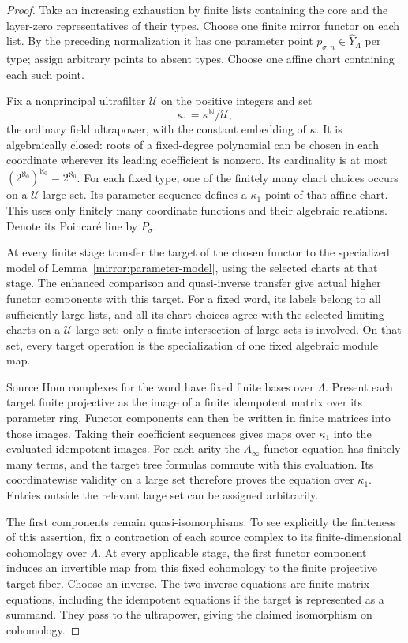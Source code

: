 \documentclass[11pt]{article}
\theoremstyle{definition}
\theoremstyle{remark}
\newcommand{\N}{\mathbb N}
\newcommand{\Ainf}{A_\infty}
\numberwithin{equation}{section}
\begin{document}
\begin{proof}
Take an increasing exhaustion by finite lists containing the core
and the layer-zero representatives of their types.  Choose one
finite mirror functor on each list.  By the preceding normalization
it has one parameter point $p_{\sigma,n}\in\widehat Y_\Lambda$
per type; assign arbitrary points to absent types.  Choose one
affine chart containing each such point.

Fix a nonprincipal ultrafilter $\mathcal U$ on the positive integers
and set
\[
 \kappa_1=\kappa^{\N}/\mathcal U,
\]
the ordinary field ultrapower, with the constant embedding of
$\kappa$.  It is algebraically closed: roots of a fixed-degree
polynomial can be chosen in each coordinate wherever its leading
coefficient is nonzero.  Its cardinality is at most
$(2^{\aleph_0})^{\aleph_0}=2^{\aleph_0}$.  For each fixed type,
one of the finitely many chart choices occurs on a
$\mathcal U$-large set.  Its parameter sequence defines a
$\kappa_1$-point of that affine chart.  This uses only finitely many
coordinate functions and their algebraic relations.  Denote its
Poincar\'e line by $P_\sigma$.

At every finite stage transfer the target of the chosen functor to
the specialized model of Lemma~\ref{mirror:parameter-model}, using
the selected charts at that stage.  The enhanced comparison and
quasi-inverse transfer give actual higher functor components with
this target.  For a fixed word, its labels belong to all sufficiently
large lists, and all its chart choices agree with the selected
limiting charts on a $\mathcal U$-large set: only a finite
intersection of large sets is involved.  On that set, every target
operation is the specialization of one fixed algebraic module map.

Source Hom complexes for the word have fixed finite bases over
$\Lambda$.  Present each target finite projective as the image of
a finite idempotent matrix over its parameter ring.  Functor
components can then be written in finite matrices into those
images.  Taking their coefficient sequences gives maps over
$\kappa_1$ into the evaluated idempotent images.  For each arity
the $\Ainf$ functor equation has finitely many terms, and the target
tree formulas commute with this evaluation.  Its coordinatewise
validity on a large set therefore proves the equation over
$\kappa_1$.  Entries outside the relevant large set can be assigned
arbitrarily.

The first components remain quasi-isomorphisms.  To see explicitly
the finiteness of this assertion, fix a contraction of each source
complex to its finite-dimensional cohomology over $\Lambda$.
At every applicable stage, the first functor component induces an
invertible map from this fixed cohomology to the finite projective
target fiber.  Choose an inverse.  The two inverse equations are
finite matrix equations, including the idempotent equations if
the target is represented as a summand.  They pass to the
ultrapower, giving the claimed isomorphism on cohomology.


\end{proof}
\end{document}

